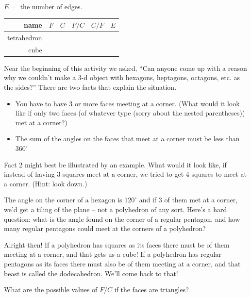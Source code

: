 $E =$ the number of edges.
\bigskip

\begin{tabular}{r|c|c|c|c|c} 
\bigstrut name & $F$ & $C$ & $F/C$ & $C/F$ & $E$ \\ \hline
\bigstrut tetrahedron & \hstrut & \hstrut & \hstrut & \hstrut & \hstrut \\ \hline
\bigstrut cube & & & & & 
\end{tabular}

\wbvfill

\wbnewpage

Near the beginning of this activity we asked, ``Can anyone come up with a reason why we couldn't make a 3-d object with hexagons, heptagons, octagons, etc. as the sides?''  There are two facts that explain the situation.

\begin{itemize}
    \item[{\bf Fact 1:}] You have to have 3 or more faces meeting at a corner. \newline
    (What would it look like if only two faces (of whatever type (sorry about the nested parentheses)) met at a corner?)
    \item[{\bf Fact 2:}] The sum of the angles on the faces that meet at a corner must be less than $360^\circ$ \newline
\end{itemize}

Fact 2 might best be illustrated by an example.  What would it look like, if instead of having 3 squares meet at a corner, we tried to get 4 squares to meet at a corner. (Hint: look down.)

The angle on the corner of a hexagon is $120^\circ$ and if $3$ of them met at a corner, we'd get a tiling of the plane -- not a polyhedron of any sort.  Here's a hard question: what is the angle found on the corner of a regular pentagon, and how many regular pentagons could meet at the corners of a polyhedron?

\vspace{1in}

Alright then! If a polyhedron has squares as its faces there must be \underline{\hstrut} of them meeting at a corner, and that gets us a cube!  If a polyhedron has regular pentagons as its faces there must also be \underline{\hstrut} of them meeting at a corner, and that beast is called the dodecahedron.  We'll come back to that!

What are the possible values of $F/C$ if the faces are triangles?

